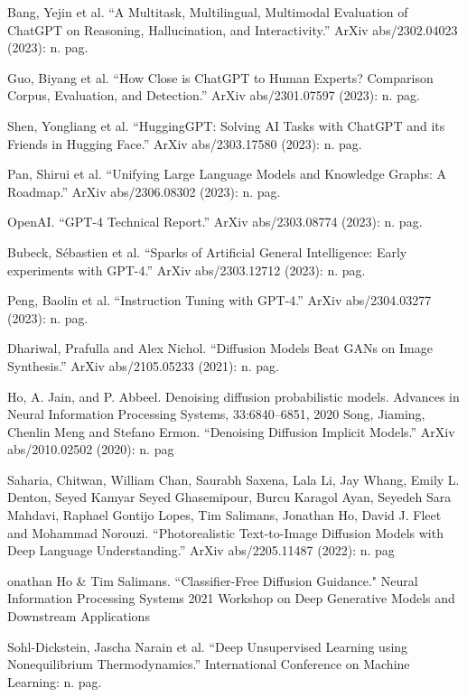 \documentclass[preprint,12pt,authoryear]{elsarticle}
\begin{document}
\begin{thebibliography}{00}
Bang, Yejin et al. “A Multitask, Multilingual, Multimodal Evaluation of ChatGPT on Reasoning, Hallucination, and Interactivity.” ArXiv abs/2302.04023 (2023): n. pag.

Guo, Biyang et al. “How Close is ChatGPT to Human Experts? Comparison Corpus, Evaluation, and Detection.” ArXiv abs/2301.07597 (2023): n. pag.

Shen, Yongliang et al. “HuggingGPT: Solving AI Tasks with ChatGPT and its Friends in Hugging Face.” ArXiv abs/2303.17580 (2023): n. pag.

Pan, Shirui et al. “Unifying Large Language Models and Knowledge Graphs: A Roadmap.” ArXiv abs/2306.08302 (2023): n. pag.

OpenAI. “GPT-4 Technical Report.” ArXiv abs/2303.08774 (2023): n. pag.

Bubeck, Sébastien et al. “Sparks of Artificial General Intelligence: Early experiments with GPT-4.” ArXiv abs/2303.12712 (2023): n. pag.

Peng, Baolin et al. “Instruction Tuning with GPT-4.” ArXiv abs/2304.03277 (2023): n. pag.

Dhariwal, Prafulla and Alex Nichol. “Diffusion Models Beat GANs on Image Synthesis.” ArXiv abs/2105.05233 (2021): n. pag.

Ho, A. Jain, and P. Abbeel. Denoising diffusion probabilistic models. Advances in
Neural Information Processing Systems, 33:6840–6851, 2020
Song, Jiaming, Chenlin Meng and Stefano Ermon. “Denoising Diffusion Implicit
Models.” ArXiv abs/2010.02502 (2020): n. pag

Saharia, Chitwan, William Chan, Saurabh Saxena, Lala Li, Jay Whang, Emily L.
Denton, Seyed Kamyar Seyed Ghasemipour, Burcu Karagol Ayan, Seyedeh Sara
Mahdavi, Raphael Gontijo Lopes, Tim Salimans, Jonathan Ho, David J. Fleet and
Mohammad Norouzi. “Photorealistic Text-to-Image Diffusion Models with Deep
Language Understanding.” ArXiv abs/2205.11487 (2022): n. pag

onathan Ho \& Tim Salimans. “Classifier-Free Diffusion Guidance." Neural Information Processing Systems 2021
Workshop on Deep Generative Models and Downstream Applications

Sohl-Dickstein, Jascha Narain et al. “Deep Unsupervised Learning using Nonequilibrium Thermodynamics.” International Conference on Machine Learning: n. pag.


\end{thebibliography}
\end{document}
